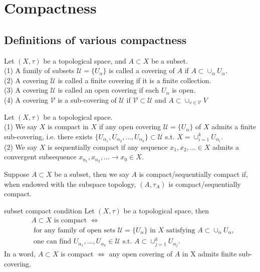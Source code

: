 \chapter{Compactness}\label{chp:compactness}

\section{Definitions of various compactness}


\begin{definition}{}{}
    Let $(X,\tau)$ be a topological space, and $A\subset X$ be a subset.\\
    (1) A family of subsets $\mathscr{U}=\{U_{\alpha}\}$ is called a covering of $A$ if $A\subset \cup_{\alpha} U_{\alpha}$.\\
    (2) A covering $\mathscr{U}$ is called a finite covering if it is a finite collection.\\
    (3) A covering $\mathscr{U}$ is called an open covering if each $U_{\alpha}$ is open.\\
    (4) A covering $\mathscr{V}$ is a sub-covering of $\mathscr{U}$ if $\mathscr{V}\subset \mathscr{U}$ and $A\subset \cup_{v\in\mathscr{V}}V$
\end{definition}

\begin{definition}{}{}
    Let $(X,\tau)$ be a topological space. \\
    (1) We say $X$ is compact in $X$ if any open covering $\mathscr{U}=\{U_{\alpha}\}$ of $X$ admits a finite sub-covering, 
    i.e. there exists $\{U_{\alpha_1},U_{\alpha_2},...,U_{\alpha_k}\}\subset \mathcal{U}$ s.t. $X=\cup_{i=1}^{k}U_{\alpha_i}$.\\
    (2) We say $X$ is sequentially compact if any sequence $x_1,x_2,...\in X$ admits a
    convergent subsequence $x_{n_1},x_{n_2},...\rightarrow x_0\in X$.
\end{definition}

\begin{remark}
    Suppose $A\subset X$ be a subset, then we say $A$ is compact/sequentially compact if, 
    when endowed with the subspace topology, $(A,\tau_A)$ is compact/sequentially compact. 
\end{remark}

\begin{proposition}{}{subset compact condition}
    Let $(X,\tau)$ be a topological space, then
    \begin{align*}
        &A\subset X \text{ is compact }\Leftrightarrow \\
        &\text{ for any family of open sets $\mathcal{U}=\{U_{\alpha}\}$ in $X$ satisfying $A\subset \cup_{\alpha}U_{\alpha}$}, \\
        & \text{ one can find } U_{\alpha_1},...,U_{\alpha_k}\in \mathcal{U} \text{ s.t. } A\subset \cup_{j=1}^k U_{\alpha_j}.
    \end{align*}
    In a word, $A\subset X$ is compact $\Leftrightarrow$ any open covering of $A$ in X admits finite sub-covering. 
\end{proposition}

